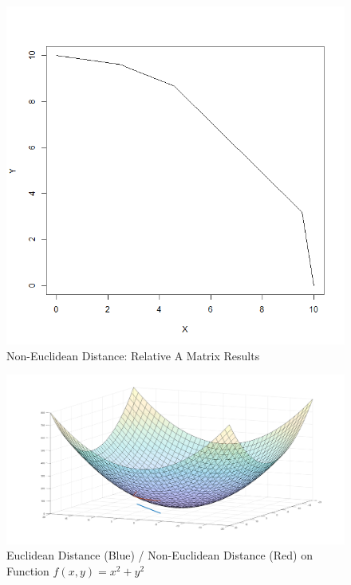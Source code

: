 \documentclass[12pt]{article}
\begin{document}
	\begin{figure}
		\centering
		\includegraphics[scale = 0.4]{non-euclidean-distance-var.png}
		\caption{Non-Euclidean Distance: Relative A Matrix Results}
		\label{fig:non-euclidean-distance-var}
	\end{figure}
	
	\begin{figure}
		\centering
		\includegraphics[scale = 0.2]{mapping_with_second.png}
		\caption{Euclidean Distance (Blue) / Non-Euclidean Distance (Red) on Function $f(x, y) = x^2 + y^2$}
		\label{fig:mapping_with_second}
	\end{figure}
\end{document}
